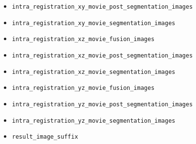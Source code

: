 \begin{itemize}
\item \texttt{intra\_registration\_xy\_movie\_post\_segmentation\_images}
\item \texttt{intra\_registration\_xy\_movie\_segmentation\_images}
\item \texttt{intra\_registration\_xz\_movie\_fusion\_images}
\item \texttt{intra\_registration\_xz\_movie\_post\_segmentation\_images}
\item \texttt{intra\_registration\_xz\_movie\_segmentation\_images}
\item \texttt{intra\_registration\_yz\_movie\_fusion\_images}
\item \texttt{intra\_registration\_yz\_movie\_post\_segmentation\_images}
\item \texttt{intra\_registration\_yz\_movie\_segmentation\_images}
\item \texttt{result\_image\_suffix}
\end{itemize}
